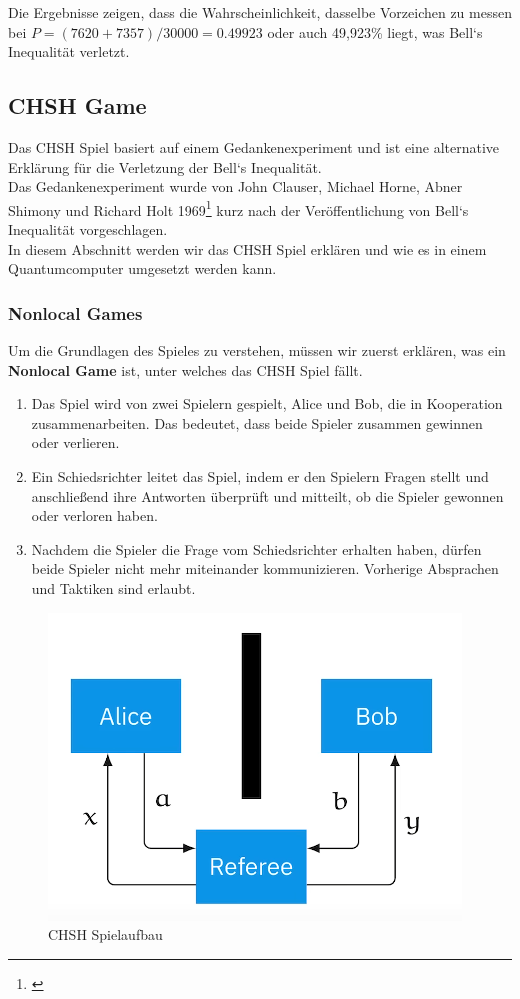 Die Ergebnisse zeigen, dass die Wahrscheinlichkeit, dasselbe Vorzeichen zu messen bei $P = (7620 + 7357) / 30000 = 0.49923$ oder auch 49,923\% liegt, was Bell`s Inequalität verletzt.\\


\subsection{CHSH Game}
\label{subsec:chsh_experimentell}
Das CHSH Spiel basiert auf einem Gedankenexperiment und ist eine alternative Erklärung für die Verletzung der Bell`s Inequalität.\\
Das Gedankenexperiment wurde von John Clauser, Michael Horne, Abner Shimony und Richard Holt 1969\footnote{\cite{clauser_proposed_1969}} kurz nach der Veröffentlichung von Bell`s Inequalität vorgeschlagen.\\

In diesem Abschnitt werden wir das CHSH Spiel erklären und wie es in einem Quantumcomputer umgesetzt werden kann.\\

\subsubsection{Nonlocal Games}
\label{subsubsec:chsh_nonlocal}

Um die Grundlagen des Spieles zu verstehen, müssen wir zuerst erklären, was ein \textbf{Nonlocal Game} ist, unter welches das CHSH Spiel fällt.
\begin{enumerate}
    \item Das Spiel wird von zwei Spielern gespielt, Alice und Bob, die in Kooperation zusammenarbeiten. Das bedeutet, dass beide Spieler zusammen gewinnen oder verlieren.
    \item Ein Schiedsrichter leitet das Spiel, indem er den Spielern Fragen stellt und anschließend ihre Antworten überprüft und mitteilt, ob die Spieler gewonnen oder verloren haben.
    \item Nachdem die Spieler die Frage vom Schiedsrichter erhalten haben, dürfen beide Spieler nicht mehr miteinander kommunizieren. Vorherige Absprachen und Taktiken sind erlaubt.
\end{enumerate}

\begin{figure}[H]
    \centering
    \includegraphics[width=0.6\linewidth]{img/CHSH-drawing.png}
    \caption{CHSH Spielaufbau \protect\cite[47m20s]{IBM_chsh_2025}}
    \label{fig:CHSHGame}
\end{figure}

